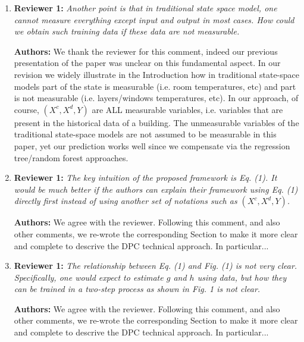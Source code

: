 \documentclass{article}
\begin{document}
\begin{enumerate}
\begin{itemize}
	\end{itemize}



\item \textbf{Reviewer 1:} \textit{Another point is that in traditional state space model, one cannot measure everything except input and output in most cases. How could we obtain such training data if these data are not measurable.}



\textbf{Authors:} We thank the reviewer for this comment, indeed our previous presentation of the paper was unclear on this fundamental aspect. In our revision we widely illustrate in the Introduction how in traditional state-space models part of the state is measurable (i.e. room temperatures, etc) and part is not measurable (i.e. layers/windows temperatures, etc). In our approach, of course, $(X^c, X^d, Y)$ are ALL measurable variables, i.e. variables that are present in the historical data of a building. The unmeasurable variables of the traditional state-space models are not assumed to be measurable in this paper, yet our prediction works well since we compensate via the regression tree/random forest approaches.



\item \textbf{Reviewer 1:} \textit{The key intuition of the proposed framework is Eq. (1). It would be much better if the authors can explain their framework using Eq. (1) directly first instead of using another set of notations such as $(X^c, X^d, Y)$.}



\textbf{Authors:} We agree with the reviewer. Following this comment, and also other comments, we re-wrote the corresponding Section to make it more clear and complete to descrive the DPC technical approach. In particular...



\item \textbf{Reviewer 1:} \textit{The relationship between Eq. (1) and Fig. (1) is not very clear. Specifically, one would expect to estimate $g$ and $h$ using data, but how they can be trained in a two-step process as shown in Fig. 1 is not clear.}



\textbf{Authors:} We agree with the reviewer. Following this comment, and also other comments, we re-wrote the corresponding Section to make it more clear and complete to descrive the DPC technical approach. In particular...



\end{enumerate}
\end{document}
